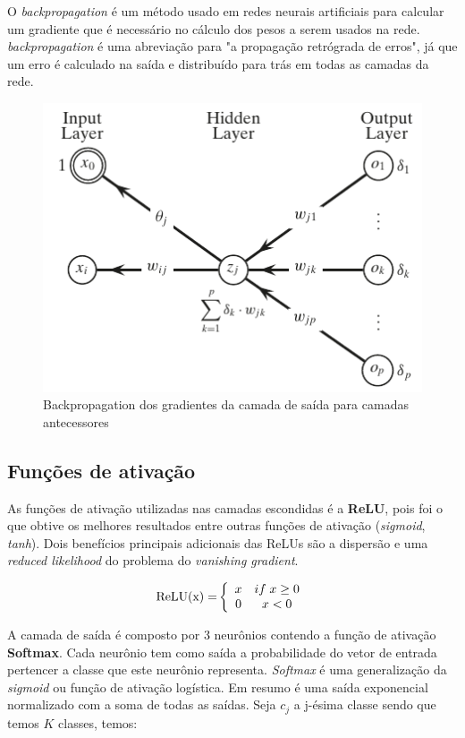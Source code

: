 O \textit{backpropagation} é um método usado em redes neurais artificiais para calcular um gradiente que é necessário no cálculo dos pesos a serem usados na rede. \textit{backpropagation} é uma abreviação para "a propagação retrógrada de erros", já que um erro é calculado na saída e distribuído para trás em todas as camadas da rede. \cite{backpropagation}\cite{rumelhart1986learning}

\begin{figure}[H]
  \centering
  \includegraphics{pdf/backpropagation.pdf}
  \caption{Backpropagation dos gradientes da camada de saída para camadas antecessores}
  \label{fig:backpropagation}
\end{figure}

\subsection{Funções de ativação}

As funções de ativação utilizadas nas camadas escondidas é a \textbf{ReLU}, pois foi o que obtive os melhores resultados entre outras funções de ativação (\textit{sigmoid}, \textit{tanh}). Dois benefícios principais adicionais das ReLUs são a dispersão e uma \textit{reduced likelihood} do problema do \textit{vanishing gradient}\cite{maas2013rectifier}.

\[{\rm{ReLU(x) = }}\left\{ {\begin{array}{*{20}{c}}
x&{if\;x \ge {\rm{0}}}\\
0&{x < 0}
\end{array}} \right.\]

A camada de saída é composto por 3 neurônios contendo a função de ativação \textbf{Softmax}. Cada neurônio tem como saída a probabilidade do vetor de entrada pertencer a classe que este neurônio representa. \textit{Softmax} é uma generalização da \textit{sigmoid} ou função de ativação logística. Em resumo é uma saída exponencial normalizado com a soma de todas as saídas. Seja $c_j$ a j-ésima classe sendo que temos $K$ classes, temos:

